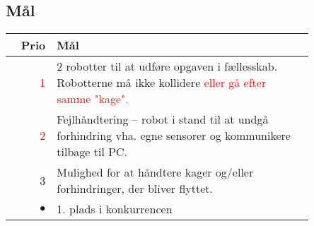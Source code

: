 \subsection{Mål}
\begin{tabular}{r p{0.85\linewidth}}
	\textbf{Prio} & \textbf{Mål} \\
	\hline
	\textcolor{red}{1} & 2 robotter til at udføre opgaven i fællesskab. Robotterne må ikke kollidere \textcolor{red}{eller gå efter samme "kage".}\\
	\textcolor{red}{2} & Fejlhåndtering -- robot i stand til at undgå forhindring vha. egne sensorer og kommunikere tilbage til PC.\\
	3 & Mulighed for at håndtere kager og/eller forhindringer, der bliver flyttet. \\
	$\bullet$ & 1. plads i konkurrencen
\end{tabular}